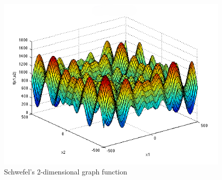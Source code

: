 \documentclass{article}
\begin{document}
\begin{figure}[!h]
\includegraphics[width=\textwidth,height=\textheight,keepaspectratio]{schwefel.png}
  \caption{Schwefel's 2-dimensional graph function \cite{sf-uni-sw}}
\end{figure}
\vspace{0.5cm}

\end{document}

